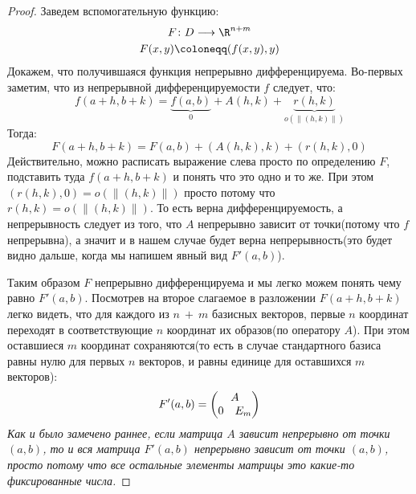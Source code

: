 \begin{proof}
  Заведем вспомогательную функцию:
  \begin{equation*}
    \begin{gathered}
      F\colon D \longrightarrow \R^{n + m} \\
      F(x, y) \coloneqq (f(x, y), y)
    \end{gathered}
  \end{equation*}
  Докажем, что получившаяся функция непрерывно дифференцируема. Во-первых заметим, что из непрерывной дифференцируемости $f$ следует, что:
  \begin{equation*}
    f(a + h, b + k) = \underbrace{f(a, b)}_{0} + A(h, k) + \underbrace{r(h, k)}_{o(\|(h, k)\|)}
  \end{equation*}
  Тогда:
  \begin{equation*}
    F(a + h, b + k) = F(a, b) + (A(h, k), k) + (r(h, k), 0)
  \end{equation*}
  Действительно, можно расписать выражение слева просто по определению $F$, подставить туда $f(a + h, b + k)$ и понять что это одно и то же. При этом $(r(h, k), 0) = o(\| (h, k) \|)$ просто потому что $r(h, k) = o(\| (h, k) \|)$. То есть верна дифференцируемость, а непрерывность следует из того, что $A$ непрерывно зависит от точки(потому что $f$ непрерывна), а значит и в нашем случае будет верна непрерывность(это будет видно дальше, когда мы напишем явный вид $F'(a, b)$).

  Таким образом $F$ непрерывно дифференцируема и мы легко можем понять чему равно $F'(a, b)$. Посмотрев на второе слагаемое в разложении $F(a + h, b + k)$ легко видеть, что для каждого из $n~+~m$ базисных векторов, первые $n$ координат переходят в соответствующие $n$ координат их образов(по оператору $A$). При этом оставшиеся $m$ координат сохраняются(то есть в случае стандартного базиса равны нулю для первых $n$ векторов, и равны единице для оставшихся $m$ векторов):
  \begin{equation*}
    F'(a, b) =
    \begin{pmatrix}
      \multicolumn{2}{c}{A} \\
      0 & E_m
    \end{pmatrix}
  \end{equation*}
  \textit{Как и было замечено раннее, если матрица $A$ зависит непрерывно от точки $(a, b)$, то и вся матрица $F'(a, b)$ непрерывно зависит от точки $(a, b)$, просто потому что все остальные элементы матрицы это какие-то фиксированные числа.}


\end{proof}
